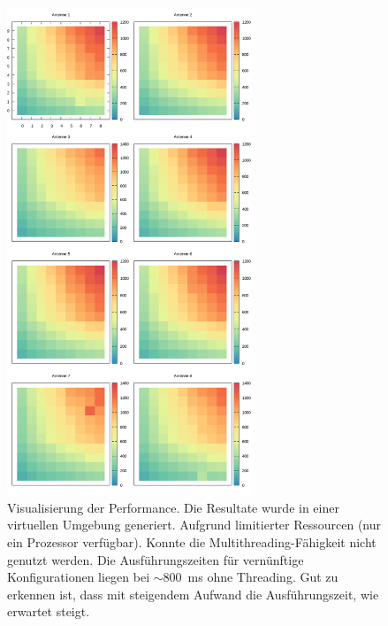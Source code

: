 %
\begin{figure}[!ht]
	\centering
	\caption[Performance Ergebnisse - Ideale Messwerte]{ Visualisierung der Performance. Die Resultate wurde in einer virtuellen Umgebung generiert. Aufgrund limitierter Ressourcen (nur ein Prozessor verfügbar). Konnte die Multithreading-Fähigkeit nicht genutzt werden. Die Ausführungszeiten für vernünftige Konfigurationen liegen bei $\sim800$~ms ohne Threading. Gut zu erkennen ist, dass mit steigendem Aufwand die Ausführungszeit, wie erwartet steigt. }
	\label{fig:results6}
	\vspace{3mm}
	\includegraphics[width=0.65\textwidth]{img/resultstiming.png}
\end{figure}
%
%
